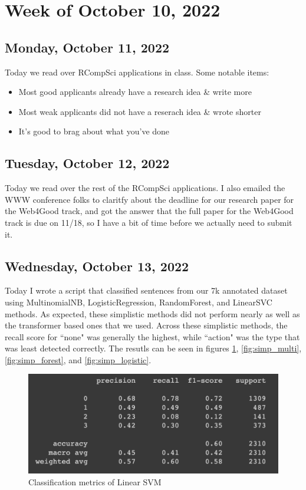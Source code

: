 \documentclass[11pt,letterpaper]{article}
\begin{document}
\section{Week of October 10, 2022}
\subsection{Monday, October 11, 2022}
Today we read over RCompSci applications in class. Some notable items:

\begin{itemize}
    \item Most good applicants already have a research idea \& write more
    \item Most weak applicants did not have a reserach idea \& wrote shorter
    \item It's good to brag about what you've done
\end{itemize}

\subsection{Tuesday, October 12, 2022}
Today we read over the rest of the RCompSci applications. I also emailed the WWW conference folks to claritfy about the deadline for our research paper for the Web4Good track, and got the answer that the full paper for the Web4Good track is due on 11/18, so I have a bit of time before we actually need to submit it.

\subsection{Wednesday, October 13, 2022}
Today I wrote a script that classified sentences from our 7k annotated dataset using MultinomialNB, LogisticRegression, RandomForest, and LinearSVC methods. As expected, these simplistic methods did not perform nearly as well as the transformer based ones that we used. Across these simplistic methods, the recall score for ``none" was generally the highest, while ``action" was the type that was least detected correctly. The resutls can be seen in figures \ref{fig:simp_linear}, \ref{fig:simp_multi}, \ref{fig:simp_forest}, and \ref{fig:simp_logistic}.

\begin{figure}
    \centering
    \includegraphics[scale=0.6]{images/simp_linear.png}
    \caption{Classification metrics of Linear SVM}
    \label{fig:simp_linear}
\end{figure}
\end{document}

